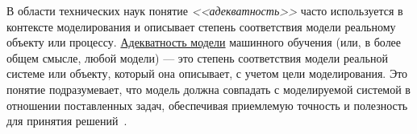 В области технических наук понятие \textit{<<адекватность>>} часто используется в контексте моделирования и описывает степень соответствия модели реальному объекту или процессу. \ul{Адекватность модели} машинного обучения (или, в более общем смысле, любой модели) — это степень соответствия модели реальной системе или объекту, который она описывает, с учетом цели моделирования. Это понятие подразумевает, что модель должна совпадать с моделируемой системой в отношении поставленных задач, обеспечивая приемлемую точность и полезность для принятия решений~\cite{SovetovYakovlevModeling2021}.


